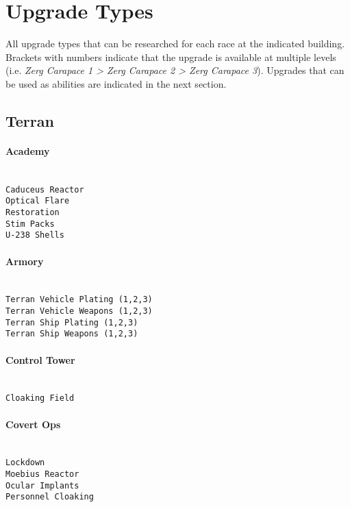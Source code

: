 \newpage
\section{Upgrade Types}
\label{upgradetype}
All upgrade types that can be researched for each race at the indicated building. Brackets with numbers indicate that the upgrade is available at multiple levels (i.e. \textit{Zerg Carapace 1 > Zerg Carapace 2 > Zerg Carapace 3}). Upgrades that can be used as abilities are indicated in the next section.

\subsection{Terran}

\paragraph{Academy} \mbox{}\\
\verb|Caduceus Reactor|\\
\verb|Optical Flare|\\
\verb|Restoration|\\
\verb|Stim Packs|\\
\verb|U-238 Shells|

\paragraph{Armory} \mbox{}\\
\verb|Terran Vehicle Plating (1,2,3)|\\
\verb|Terran Vehicle Weapons (1,2,3)|\\
\verb|Terran Ship Plating (1,2,3)|\\
\verb|Terran Ship Weapons (1,2,3)|

\paragraph{Control Tower} \mbox{}\\
\verb|Cloaking Field|

\paragraph{Covert Ops} \mbox{}\\
\verb|Lockdown|\\
\verb|Moebius Reactor|\\
\verb|Ocular Implants|\\
\verb|Personnel Cloaking|

